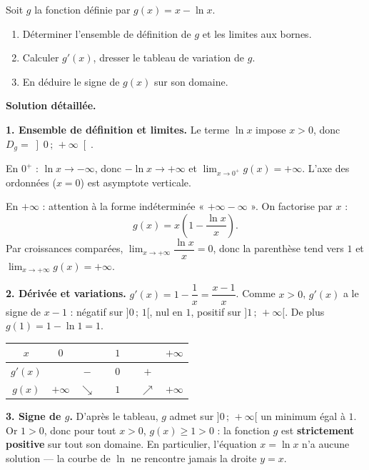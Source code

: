 \documentclass[11pt]{article}
\begin{document}
\begin{exoresolu}[Étude de $g(x) = x - \ln x$]
Soit $g$ la fonction définie par $g(x) = x - \ln x$.
\begin{enumerate}
\item Déterminer l'ensemble de définition de $g$ et les limites aux bornes.
\item Calculer $g'(x)$, dresser le tableau de variation de $g$.
\item En déduire le signe de $g(x)$ sur son domaine.
\end{enumerate}
\tcblower
\textbf{Solution détaillée.}

\textbf{1. Ensemble de définition et limites.} Le terme $\ln x$ impose $x > 0$, donc $D_g = \left]0\,;\,+\infty\right[$.

En $0^+$ : $\ln x \to -\infty$, donc $-\ln x \to +\infty$ et $\lim_{x \to 0^+} g(x) = +\infty$. L'axe des ordonnées ($x = 0$) est asymptote verticale.

En $+\infty$ : attention à la forme indéterminée « $+\infty - \infty$ ». On factorise par $x$ :
\[ g(x) = x\left(1 - \frac{\ln x}{x}\right). \]
Par croissances comparées, $\lim_{x \to +\infty} \dfrac{\ln x}{x} = 0$, donc la parenthèse tend vers $1$ et $\lim_{x \to +\infty} g(x) = +\infty$.

\textbf{2. Dérivée et variations.} $g'(x) = 1 - \dfrac{1}{x} = \dfrac{x-1}{x}$. Comme $x > 0$, $g'(x)$ a le signe de $x-1$ : négatif sur $]0\,;\,1[$, nul en $1$, positif sur $]1\,;\,+\infty[$. De plus $g(1) = 1 - \ln 1 = 1$.

\begin{center}
\begin{tabular}{|c|ccccccc|}
\hline
$x$ & $0$ & & & $1$ & & & $+\infty$ \\
\hline
$g'(x)$ & & $-$ & & $0$ & & $+$ & \\
\hline
$g(x)$ & $+\infty$ & $\searrow$ & & $1$ & & $\nearrow$ & $+\infty$ \\
\hline
\end{tabular}
\end{center}

\textbf{3. Signe de $g$.} D'après le tableau, $g$ admet sur $]0\,;\,+\infty[$ un minimum égal à $1$. Or $1 > 0$, donc pour tout $x > 0$, $g(x) \geq 1 > 0$ : la fonction $g$ est \textbf{strictement positive} sur tout son domaine. En particulier, l'équation $x = \ln x$ n'a aucune solution — la courbe de $\ln$ ne rencontre jamais la droite $y = x$.
\end{exoresolu}
\end{document}
